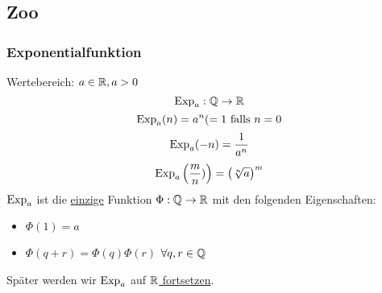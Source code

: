 \subsection{Zoo}
\subsubsection{Exponentialfunktion}
Wertebereich: $a\in\mathbb{R}, a>0$
\[\operatorname{Exp}_a:\mathbb{Q}\to\mathbb{R}\]
\[\operatorname{Exp}_a(n)=a^n (=1 \text{ falls }n=0\]
\[\operatorname{Exp}_a(-n)=\frac{1}{a^n}\]
\[\operatorname{Exp}_a\left( \frac{m}{n}) \right) = \left( \sqrt[n]{a} \right)^m\]
$\operatorname{Exp}_a$ ist die \ul{einzige} Funktion $\Phi:\mathbb{Q}\to\mathbb{R}$ mit den folgenden Eigenschaften:
\begin{itemize}
  \item $\Phi(1)=a$
  \item $\Phi(q+r)=\Phi(q)\Phi(r)$ $\forall q,r\in\mathbb{Q}$
\end{itemize}
\begin{Bem}
  Später werden wir $\operatorname{Exp}_a$ auf \ul{$\mathbb{R}$ fortsetzen}.
\end{Bem}
